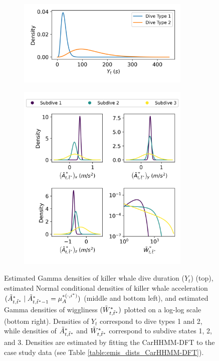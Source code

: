 \begin{figure}[ht]
    \begin{subfigure}{\textwidth}
    	\centering
    	\includegraphics[width=3.25in]{../Plots/2019/20190902-182840-CATs_OB_1_0_267_CarHHMM2-coarse-emissions.png}
    \end{subfigure}
    \newline
    \begin{subfigure}{\textwidth}
    	\centering
    	\includegraphics[width=3.25in]{../Plots/2019/20190902-182840-CATs_OB_1_0_267_CarHHMM2-fine-emissions.png}
    \end{subfigure}
    \caption{Estimated Gamma densities of killer whale dive duration ($Y_t$) (top), estimated Normal conditional densities of killer whale acceleration $(\tilde{A}^*_{t,\tilde t^*} \mid \tilde{A}^*_{t,\tilde t^*-1} = \mu_A^{*(\cdot,i^*)})$ (middle and bottom left), and estimated Gamma densities of wiggliness $(\tilde{W}^*_{t,\tilde t^*})$ plotted on a log-log scale (bottom right). Densities of $Y_t$ correspond to dive types 1 and 2, while densities of $\tilde{A}^*_{t,\tilde t^*}$ and $\tilde{W}^*_{t,\tilde t^*}$ correspond to subdive states 1, 2, and 3. Densities are estimated by fitting the CarHHMM-DFT to the case study data (see Table \ref{table:emis_dists_CarHHMM-DFT}).}
    \label{fig:emis}
\end{figure}

